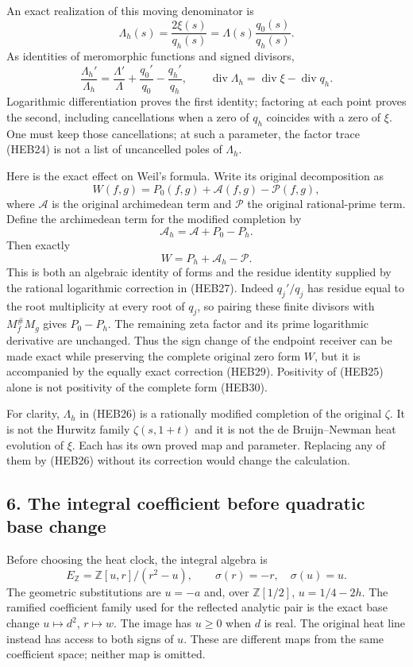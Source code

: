 \documentclass[
  10pt,
  a4paper,
]{article}
\begin{document}
An exact realization of this moving denominator is \[
\Lambda_h(s)=\frac{2\xi(s)}{q_h(s)}
=\Lambda(s)\frac{q_0(s)}{q_h(s)}.
\tag{HEB26}
\] As identities of meromorphic functions and signed divisors, \[
\frac{\Lambda_h'}{\Lambda_h}
=\frac{\Lambda'}{\Lambda}+\frac{q_0'}{q_0}-\frac{q_h'}{q_h},
\qquad
\operatorname{div}\Lambda_h=\operatorname{div}\xi-\operatorname{div}q_h.
\tag{HEB27}
\] Logarithmic differentiation proves the first identity; factoring at
each point proves the second, including cancellations when a zero of
\(q_h\) coincides with a zero of \(\xi\). One must keep those
cancellations; at such a parameter, the factor trace (HEB24) is not a
list of uncancelled poles of \(\Lambda_h\).

Here is the exact effect on Weil's formula. Write its original
decomposition as \[
W(f,g)=P_0(f,g)+\mathcal A(f,g)-\mathcal P(f,g),
\tag{HEB28}
\] where \(\mathcal A\) is the original archimedean term and
\(\mathcal P\) the original rational-prime term. Define the archimedean
term for the modified completion by \[
\mathcal A_h=\mathcal A+P_0-P_h.
\tag{HEB29}
\] Then exactly \[
W=P_h+\mathcal A_h-\mathcal P.
\tag{HEB30}
\] This is both an algebraic identity of forms and the residue identity
supplied by the rational logarithmic correction in (HEB27). Indeed
\(q_j'/q_j\) has residue equal to the root multiplicity at every root of
\(q_j\), so pairing these finite divisors with \(M_f^\#M_g\) gives
\(P_0-P_h\). The remaining zeta factor and its prime logarithmic
derivative are unchanged. Thus the sign change of the endpoint receiver
can be made exact while preserving the complete original zero form
\(W\), but it is accompanied by the equally exact correction (HEB29).
Positivity of (HEB25) alone is not positivity of the complete form
(HEB30).

For clarity, \(\Lambda_h\) in (HEB26) is a rationally modified
completion of the original \(\zeta\). It is not the Hurwitz family
\(\zeta(s,1+t)\) and it is not the de Bruijn--Newman heat evolution of
\(\xi\). Each has its own proved map and parameter. Replacing any of
them by (HEB26) without its correction would change the calculation.

\subsection{6. The integral coefficient before quadratic base
change}\label{the-integral-coefficient-before-quadratic-base-change}

Before choosing the heat clock, the integral algebra is \[
E_{\mathbb Z}=\mathbb Z[u,r]/(r^2-u),\qquad
\sigma(r)=-r,\quad\sigma(u)=u.
\tag{HEB31}
\] The geometric substitutions are \(u=-a\) and, over
\(\mathbb Z[1/2]\), \(u=1/4-2h\). The ramified coefficient family used
for the reflected analytic pair is the exact base change
\(u\mapsto d^2\), \(r\mapsto w\). The image has \(u\ge0\) when \(d\) is
real. The original heat line instead has access to both signs of \(u\).
These are different maps from the same coefficient space; neither map is
omitted.
\end{document}
